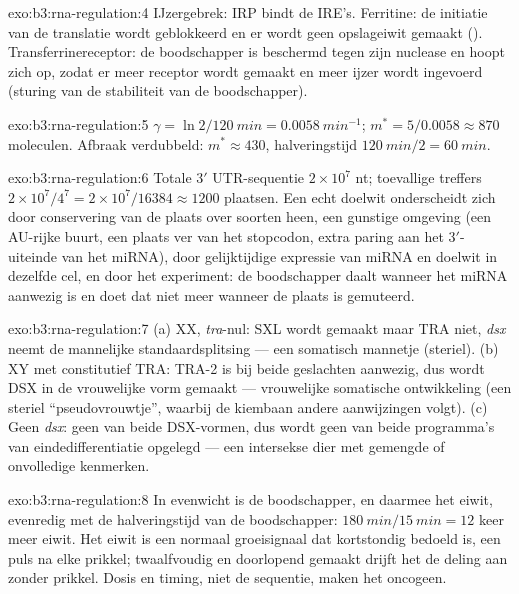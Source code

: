 \begin{solution}{exo:b3:rna-regulation:4}
IJzergebrek: IRP bindt de IRE's. Ferritine: de initiatie van de
translatie wordt geblokkeerd en er wordt geen opslageiwit gemaakt
(). Transferrinereceptor: de boodschapper is
beschermd tegen zijn nuclease en hoopt zich op, zodat er meer receptor
wordt gemaakt en meer ijzer wordt ingevoerd (sturing van de
stabiliteit van de boodschapper).
\end{solution}

\begin{solution}{exo:b3:rna-regulation:5}
$\gamma = \ln 2/\qty{120}{min} = \qty{0.0058}{min^{-1}}$; $m^{*} =
5/0.0058 \approx 870$ moleculen. Afbraak verdubbeld: $m^{*} \approx 430$,
halveringstijd $\qty{120}{min}/2 = \qty{60}{min}$.
\end{solution}

\begin{solution}{exo:b3:rna-regulation:6}
Totale 3$'$ UTR-sequentie $2\times 10^{7}$ nt; toevallige treffers $2\times
10^{7}/4^{7} = 2\times 10^{7}/\num{16384} \approx \num{1200}$ plaatsen.
Een echt doelwit onderscheidt zich door conservering van de plaats over
soorten heen, een gunstige omgeving (een AU-rijke buurt, een plaats ver
van het stopcodon, extra paring aan het 3$'$-uiteinde van het miRNA),
door gelijktijdige expressie van miRNA en doelwit in dezelfde cel, en
door het experiment: de boodschapper daalt wanneer het miRNA aanwezig
is en doet dat niet meer wanneer de plaats is gemuteerd.
\end{solution}

\begin{solution}{exo:b3:rna-regulation:7}
(a) XX, \emph{tra}-nul: SXL wordt gemaakt maar TRA niet, \emph{dsx}
neemt de mannelijke standaardsplitsing --- een somatisch mannetje
(steriel). (b) XY met constitutief TRA: TRA-2 is bij beide geslachten
aanwezig, dus wordt DSX in de vrouwelijke vorm gemaakt --- vrouwelijke
somatische ontwikkeling (een steriel ``pseudovrouwtje'', waarbij de
kiembaan andere aanwijzingen volgt). (c) Geen \emph{dsx}: geen van
beide DSX-vormen, dus wordt geen van beide programma's van
eindedifferentiatie opgelegd --- een intersekse dier met gemengde of
onvolledige kenmerken.
\end{solution}

\begin{solution}{exo:b3:rna-regulation:8}
In evenwicht is de boodschapper, en daarmee het eiwit, evenredig met de
halveringstijd van de boodschapper: $\qty{180}{min}/\qty{15}{min} = 12$
keer meer eiwit. Het eiwit is een normaal groeisignaal dat kortstondig
bedoeld is, een puls na elke prikkel; twaalfvoudig en doorlopend
gemaakt drijft het de deling aan zonder prikkel. Dosis en timing, niet
de sequentie, maken het oncogeen.
\end{solution}

